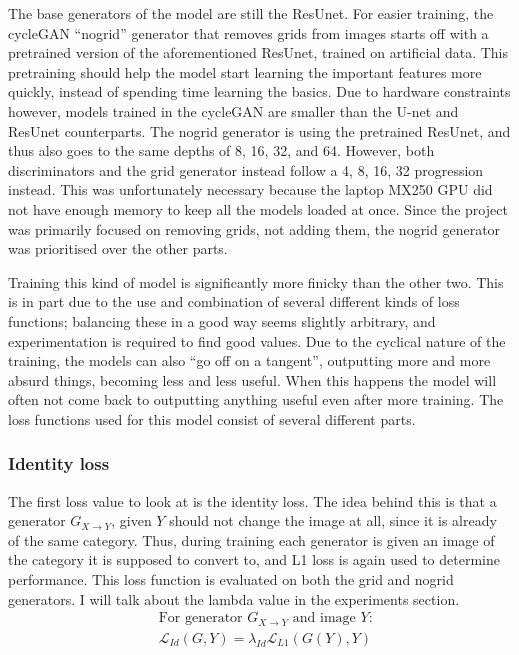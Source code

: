 The base generators of the model are still the ResUnet. For easier training, the cycleGAN ``nogrid'' generator that removes grids from images starts off with a pretrained version of the aforementioned ResUnet, trained on artificial data. This pretraining should help the model start learning the important features more quickly, instead of spending time learning the basics. Due to hardware constraints however, models trained in the cycleGAN are smaller than the U-net and ResUnet counterparts. The nogrid generator is using the pretrained ResUnet, and thus also goes to the same depths of 8, 16, 32, and 64. However, both discriminators and the grid generator instead follow a 4, 8, 16, 32 progression instead. This was unfortunately necessary because the laptop MX250 GPU did not have enough memory to keep all the models loaded at once. Since the project was primarily focused on removing grids, not adding them, the nogrid generator was prioritised over the other parts.

Training this kind of model is significantly more finicky than the other two. This is in part due to the use and combination of several different kinds of loss functions; balancing these in a good way seems slightly arbitrary, and experimentation is required to find good values. Due to the cyclical nature of the training, the models can also ``go off on a tangent'', outputting more and more absurd things, becoming less and less useful. When this happens the model will often not come back to outputting anything useful even after more training. The loss functions used for this model consist of several different parts.

\subsubsection{Identity loss}
The first loss value to look at is the identity loss. The idea behind this is that a generator $G_{X\rightarrow Y}$, given $Y$ should not change the image at all, since it is already of the same category. Thus, during training each generator is given an image of the category it is supposed to convert to, and L1 loss is again used to determine performance. This loss function is evaluated on both the grid and nogrid generators. I will talk about the lambda value in the experiments section.
\begin{align}
  &\text{For generator $G_{X\rightarrow Y}$ and image $Y$:} \nonumber\\
  &\mathcal{L}_{Id}(G,Y) = \lambda_{Id} \mathcal{L}_{L1}\left(G(Y),Y\right)\label{eq:idlambda}
\end{align}


